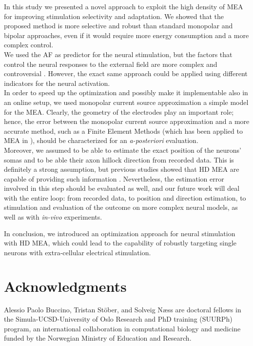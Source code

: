 \documentclass[conference]{IEEEtran}
\begin{document}
In this study we presented a novel approach to exploit the high density
of MEA for improving stimulation selectivity and adaptation. We showed
that the proposed method is more selective and robust than standard
monopolar and bipolar approaches, even if it would require more energy
consumption and a more complex control. \\
We used the AF as predictor for the neural stimulation, but the factors that
control the neural responses to the external field are more complex and 
controversial \cite{joucla2012modeling}. However, the exact same approach could
be applied using different indicators for the neural activation. \\
In order to speed up the optimization and possibly make it implementable
also in an online setup, we used monopolar current source approximation
a simple model for the MEA. Clearly, the geometry of the electrodes
play an important role; hence, the error between the monopolar current
source approximation and a more accurate method, such as a Finite
Element Methods (which has been applied to MEA in \cite{joucla2013current}),
should be characterized for an \emph{a-posteriori }evaluation. \\
Moreover, we assumed to be able to estimate the exact position of
the neurons' somas and to be able their axon hillock direction from
recorded data. This is definitely a strong assumption, but previous
studies showed that HD MEA are capable of providing such information
\cite{ruz2014localising}\cite{muller2015high}. Nevertheless, the
estimation error involved in this step should be evaluated as well,
and our future work will deal with the entire loop: from recorded
data, to position and direction estimation, to stimulation and evaluation
of the outcome on more complex neural models, as well as with \emph{in-vivo} experiments. \par
In conclusion, we introduced an optimization approach for neural stimulation
with HD MEA, which could lead to the capability of robustly targeting
single neurons with extra-cellular electrical stimulation.


\section{Acknowledgments}

Alessio Paolo Buccino, Tristan Stöber, and Solveig Næss are doctoral
fellows in the Simula-UCSD-University of Oslo Research and PhD training
(SUURPh) program, an international collaboration in computational
biology and medicine funded by the Norwegian Ministry of Education
and Research.




\end{document}
